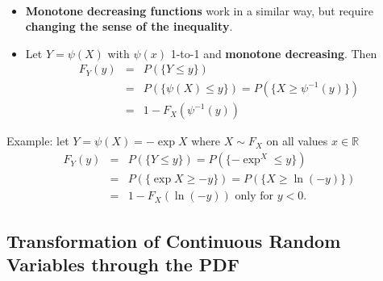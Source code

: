 \documentclass[smaller]{beamer}\usepackage[]{graphicx}\usepackage[]{color}
\renewcommand{\Pr}{P}
\begin{document}
\begin{frame}{\secname}
\framesubtitle{\subsecname}

  \begin{itemize}
  \item \textbf{Monotone decreasing functions} work in a similar way, but require
  \textbf{changing the sense of the inequality}.

  \item Let $Y=\psi \left( X\right) $ with $\psi \left( x\right) $ 1-to-1 and
  \textbf{monotone decreasing}. Then
  \begin{eqnarray*}
  F_{Y}\left( y\right) &=&\Pr \left( \{ Y\leq y \} \right) \\
  &=&\Pr \left( \{ \psi \left( X\right) \leq y \} \right) =\Pr \left( \{ X\geq \psi
  ^{-1}\left( y\right) \} \right) \\
  &=&1-F_{X}\left( \psi ^{-1}\left( y\right) \right)
  \end{eqnarray*}

  \end{itemize}

  \pause

  \begin{example}
  \begin{footnotesize}
  Example: let $Y=\psi \left( X\right) =-\exp X $ where $%
  X\sim F_X$ on all values $x\in
  \mathbb{R}
  $%
  \begin{eqnarray*}
  F_{Y}\left( y\right) &=&\Pr \left( \{ Y\leq y \}\right) =\Pr \left( \{ -\exp ^
  X \leq y \} \right) \\
  &=&\Pr \left( \{ \exp X \geq -y \} \right) =\Pr \left( \{ X\geq \ln
  \left( -y\right) \} \right) \\
  &=&1-F_{X}\left( \ln \left( -y\right) \right) \text{ only for }y<0\text{.}
  \end{eqnarray*}
  \end{footnotesize}
  \end{example}
\end{frame}

\subsection{Transformation of Continuous Random Variables through the PDF}
\end{document}
